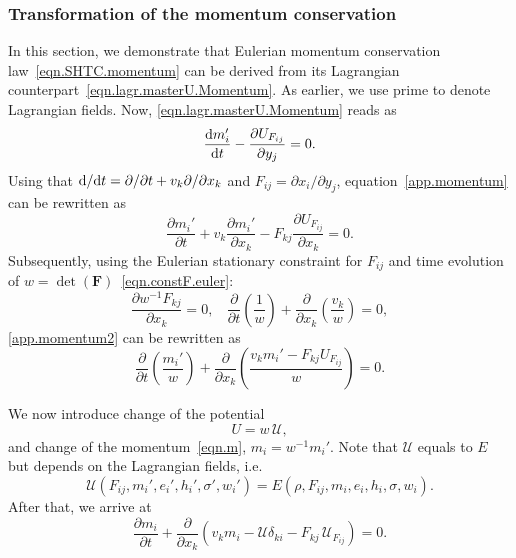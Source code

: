 \documentclass[twoside]{article}
\newcommand{\FF}{{\boldsymbol{F}}}
\newcommand{\scU}{{\mathscr{U}}}
\newcommand{\ted}{E} %
\newcommand{\pd}{\partial}
\begin{document}
\subsubsection{Transformation of the momentum conservation} 
\label{app.EulertoLagr.momentum}

In this section, we demonstrate that Eulerian momentum conservation 
law~\eqref{eqn.SHTC.momentum}  can be derived from its Lagrangian 
counterpart~\eqref{eqn.lagr.masterU.Momentum}. As earlier, we use prime to 
denote Lagrangian fields. Now, 
\eqref{eqn.lagr.masterU.Momentum} reads as
\begin{equation}\label{app.momentum}
\frac{{\rm d}m_i'}{{\rm d}t}-\frac{\pd U_{F_{ij}}}{\pd y_j}=0.
\end{equation}
Using that $ {\rm d}/{\rm d}t = \pd /\pd t + v_k\pd/\pd x_k $ and $ 
F_{ij}=\pd x_i/\pd y_j $, equation~\eqref{app.momentum} can be rewritten as
\begin{equation}\label{app.momentum2}
\frac{\pd m_i'}{\pd t} + v_k\frac{\pd m_i'}{\pd x_k} - F_{kj}\frac{\pd 
U_{F_{ij}}}{\pd x_k}=0.
\end{equation}
Subsequently, using the Eulerian stationary constraint for $ F_{ij} $ and time 
evolution of $ w=\det(\FF) $~\eqref{eqn.constF.euler}:
\begin{equation}
\frac{\pd w^{-1}F_{kj}}{\pd x_k}=0,\ \ \ \ \frac{\pd }{\pd t}\left ( 
\frac{1}{w}\right ) + \frac{\pd }{\pd x_k}\left( 
\frac{v_k}{w}\right) =0,
\end{equation}
\eqref{app.momentum2} can be rewritten as
\begin{equation}\label{app.momentum3}
\frac{\pd }{\pd t}\left(\frac{m_i'}{w}\right)  + \frac{\pd }{\pd 
x_k}\left(\frac{v_k m_i' - F_{kj}U_{F_{ij}}}{w}\right) =0.
\end{equation}

We now introduce change of the potential 
\[ U = w \, \scU ,\]
and change of the momentum~\eqref{eqn.m},  $ m_i=w^{-1}m_i' $. Note that $ \scU 
$ equals to $ \ted 
$ but depends on the Lagrangian fields, i.e.
\begin{equation}\label{app.scU.mcE}
\scU(F_{ij},m_i',e_i',h_i',\sigma',w_i') = 
\ted(\rho,F_{ij},m_i,e_i,h_i,\sigma,w_i).
\end{equation}
After that, we arrive at
\begin{equation}\label{app.momentum4}
\frac{\pd m_i}{\pd t}  + \frac{\pd }{\pd 
x_k}\left(v_k m_i - \scU \delta_{ki} - F_{kj}\,\scU_{F_{ij}}\right) =0.
\end{equation}
\end{document}

